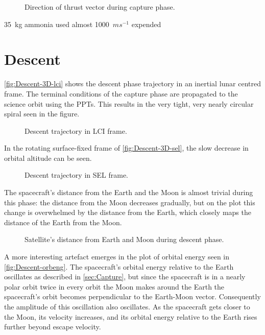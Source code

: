 \begin{figure}
\centering
\def\svgwidth{\figurewidth}

\caption{Direction of thrust vector during capture phase.}
\label{fig:Capture-thrust}
\end{figure}

35~kg ammonia used
almost 1000~$ms^{-1}$ expended

\clearpage

\section{Descent} \label{sec:Descent}

\autoref{fig:Descent-3D-lci} shows the descent phase trajectory in an inertial lunar centred frame. The terminal conditions of the capture phase are propagated to the science orbit using the PPTs. This results in the very tight, very nearly circular spiral seen in the figure.

\begin{figure}
\centering
\def\svgwidth{\figurewidth}

\caption{Descent trajectory in LCI frame.}
\label{fig:Descent-3D-lci}
\end{figure}

In the rotating surface-fixed frame of \autoref{fig:Descent-3D-sel}, the slow decrease in orbital altitude can be seen.

\begin{figure}
\centering
\def\svgwidth{\figurewidth}

\caption{Descent trajectory in SEL frame.}
\label{fig:Descent-3D-sel}
\end{figure}

The spacecraft's distance from the Earth and the Moon is almost trivial during this phase: the distance from the Moon decreases gradually, but on the plot this change is overwhelmed by the distance from the Earth, which closely maps the distance of the Earth from the Moon.

\begin{figure}
\centering
\def\svgwidth{\figurewidth}

\caption{Satellite's distance from Earth and Moon during descent phase.}
\label{fig:Descent-dist}
\end{figure}

A more interesting artefact emerges in the plot of orbital energy seen in \autoref{fig:Descent-orbeng}. The spacecraft's orbital energy relative to the Earth oscillates as described in \autoref{sec:Capture}, but since the spacecraft is in a nearly polar orbit twice in every orbit the Moon makes around the Earth the spacecraft's orbit becomes perpendicular to the Earth-Moon vector. Consequently the amplitude of this oscillation also oscillates. As the spacecraft gets closer to the Moon, its velocity increases, and its orbital energy relative to the Earth rises further beyond escape velocity.

